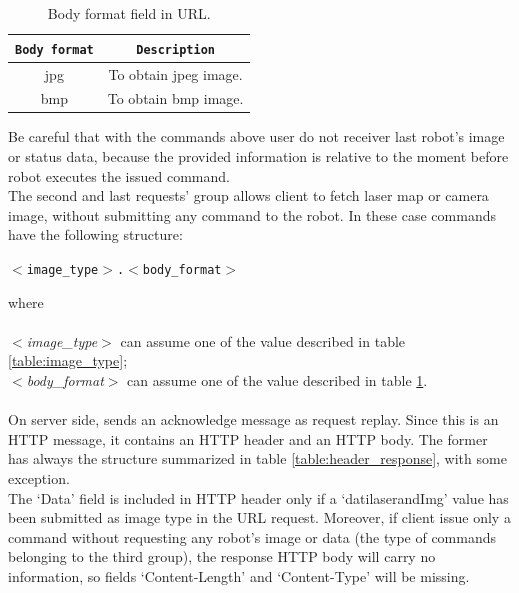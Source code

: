 \begin{table}[!h]
  \centering  
  \begin{tabular}{| c | c |}

    \hline
    \texttt{\bf Body format} &
    \texttt{\bf Description} \\ %

    \hline
    \parbox[t]{6.5cm}{\raggedright \small jpg } &
    \parbox[t]{6cm}{\raggedright \small
      To obtain jpeg image.} \\  [1ex]

    \hline
    \parbox[t]{6.5cm}{\raggedright \small bmp } &
    \parbox[t]{6cm}{\raggedright \small
      To obtain bmp image.} \\  [1ex]
    \hline

  \end{tabular}
  \caption{Body format field in URL.}
  \label{table:body_format}
\end{table}

Be careful that with the commands above user do not receiver last robot's image or
status data, because the provided information is relative to the moment
before robot executes the issued command.
\\
The second and last requests' group allows client to fetch laser map or camera image,
without submitting any command to the robot. In these case commands have
the following structure:

\begin{center}
  \texttt{$<$image\_type$>$.$<$body\_format$>$}
\end{center}

where \\ \\
\textit{$<$image\_type$>$} can assume one of the value described in table
\ref{table:image_type};\\
\textit{$<$body\_format$>$} can assume one of the value described in table
\ref{table:body_format}. \\
\\
On server side, \morduc{} sends an acknowledge message as
request replay. Since this is an HTTP message, it contains an HTTP header and
an HTTP body. The former has always the structure summarized in table 
\ref{table:header_response}, with some exception.
\\
The `Data' field is included in HTTP header only if a `datilaserandImg'
value has been submitted as image type in the URL request. Moreover, if client
issue only a command without requesting any robot's image or data (the type
of commands belonging to the third group), the response HTTP body will carry
no information, so fields `Content-Length' and `Content-Type' will be missing.

